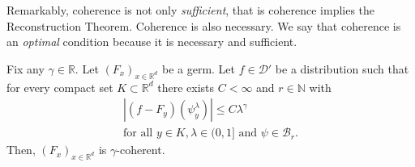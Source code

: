 Remarkably, coherence is not only \emph{sufficient}, that is coherence implies the Reconstruction Theorem. Coherence is also necessary. We say that coherence is an \emph{optimal} condition because it is necessary and sufficient.

\begin{theorem}\label{theorem:coherence-is-necessary}
   Fix any \(\gamma \in \mathbb{R}\).  Let \({(F_x)}_{x \in \mathbb{R}^d}\) be a germ. Let \(f \in \mathcal{D}'\) be a distribution such that for every compact set \(K \subset \mathbb{R}^d\) there exists \(C < \infty\) and \(r \in \mathbb{N}\) with
   \begin{gather}\label{thm:coh-necessary}
        |(f-F_y)(\psi^\lambda_y)| \leq C \lambda^\gamma \\
        \text{for all \(y \in K, \lambda \in (0,1]\) and \(\psi \in \mathcal{B}_r\).} \nonumber
   \end{gather}
   Then, \({(F_x)}_{x \in \mathbb{R}^d}\) is \(\gamma\)-coherent.  
\end{theorem}

